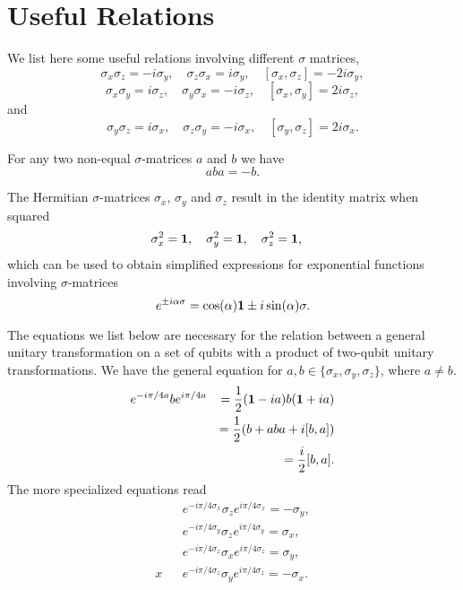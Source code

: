 \section{Useful Relations}

We list here some useful relations involving different $\sigma$ matrices,
\begin{equation}
\sigma_x \sigma_z = -i\sigma_y, \quad
\sigma_z \sigma_x = i\sigma_y, \quad [\sigma_x, \sigma_z]=-2i\sigma_y,
\end{equation}
\begin{equation}
\sigma_x \sigma_y = i\sigma_z, \quad
\sigma_y \sigma_x = -i\sigma_z, \quad [\sigma_x, \sigma_y]=2i\sigma_z,
\end{equation}
and
\begin{equation}
\sigma_y \sigma_z = i\sigma_x, \quad
\sigma_z \sigma_y = -i\sigma_x, \quad [\sigma_y, \sigma_z]=2i\sigma_x.
\end{equation}


For any two non-equal $\sigma$-matrices $a$ and $b$ we have 
\begin{equation}
aba = -b.
\end{equation}

The Hermitian $\sigma$-matrices $\sigma_x$, $\sigma_y$ and $\sigma_z$
result in the identity matrix when squared
\begin{equation}
\sigma_x^2 = {\bf 1},\quad 
\sigma_y^2 = {\bf 1},\quad 
\sigma_z^2 = {\bf 1},\quad 
\end{equation}
which can be used to obtain  simplified expressions for exponential functions involving $\sigma$-matrices
\begin{equation}
e^{\pm i\alpha \sigma}=\cos(\alpha) {\bf 1} \pm i \sin(\alpha) \sigma. 
\end{equation}

The equations we list below are necessary for the relation between  a general unitary
transformation on a set of qubits with  a product of two-qubit unitary
transformations. We have the general equation for $a,b \in \{\sigma_x,\sigma_y, \sigma_z\}$, where $a\neq b$.
\begin{eqnarray}
  e^{-i\pi/4a} b e^{i\pi/4a} &&= \frac{1}{2} ({\bf 1} -ia) b ( {\bf 1} + ia)
  \notag\\ 
  &&=  \frac{1}{2} (b + aba + i[b,a]) \notag\\
  &&= \frac{i}{2}[b,a].
\end{eqnarray}
The more specialized equations read
\begin{eqnarray}
  \label{eq:rotations1}
  &&e^{-i\pi/4 \sigma_x} \sigma_z e^{i\pi/4 \sigma_x} = -\sigma_y, \\
  \label{eq:rotations2}
  &&e^{-i\pi/4 \sigma_y} \sigma_z e^{i\pi/4 \sigma_y} = \sigma_x, \\
  \label{eq:rotations3}
  &&e^{-i\pi/4 \sigma_z} \sigma_x e^{i\pi/4 \sigma_z} = \sigma_y, \\
x  \label{eq:rotations4}
  &&e^{-i\pi/4 \sigma_z} \sigma_y e^{i\pi/4 \sigma_z} = -\sigma_x. 
\end{eqnarray}

